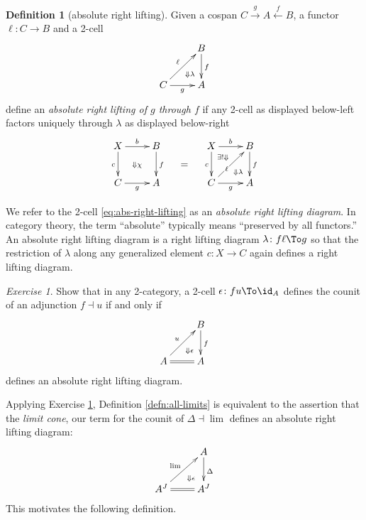 \documentclass[12pt,reqno]{amsart}
\theoremstyle{plain}
\theoremstyle{definition}
\newtheorem{defn}[thm]{Definition}
\theoremstyle{remark}
\newtheorem{exs}[thm]{Exercise}
\numberwithin{equation}{subsection}
\begin{document}
\begin{defn}[absolute right lifting] Given a cospan $C \xrightarrow{g} A \xleftarrow{f} B$, a functor $\ell \colon C \to B$ and a 2-cell \begin{equation}\label{eq:abs-right-lifting} \xymatrix{ \ar@{}[dr]|(.7){\Downarrow\lambda} & B \ar[d]^f \\ C \ar[ur]^\ell \ar[r]_g & A}\end{equation} define an \emph{absolute right lifting of $g$ through $f$} if any 2-cell as displayed below-left factors uniquely through $\lambda$ as displayed below-right
\[    \vcenter{\xymatrix{ X \ar[d]_c \ar[r]^b \ar@{}[dr]|{\Downarrow\chi} & B \ar[d]^f \\ C \ar[r]_g & A}} \mkern20mu = \mkern20mu \vcenter{\xymatrix{ X \ar[d]_c \ar[r]^b \ar@{}[dr]|(.3){\exists !\Downarrow}|(.7){\Downarrow\lambda} & B \ar[d]^f \\ C \ar[ur]|(.4)*+<2pt>{\scriptstyle \ell} \ar[r]_g & A}}
\]
\end{defn}

We refer to the 2-cell \eqref{eq:abs-right-lifting} as an \emph{absolute right lifting diagram}. In category theory, the term ``absolute'' typically means ``preserved by all functors.'' An absolute right lifting diagram is a right lifting diagram $\lambda \colon f\ell \To g$ so that the restriction of $\lambda$ along any generalized element $c \colon X \to C$ again defines a right lifting diagram.


\begin{exs}\label{exs:adj-as-abs-lifting} Show that in any 2-category, a 2-cell $\epsilon \colon fu \To \id_A$ defines the counit of an adjunction $f \dashv u$ if and only if
\[ \xymatrix{ \ar@{}[dr]|(.7){\Downarrow\epsilon} & B \ar[d]^f \\ A \ar[ur]^u \ar@{=}[r] & A}\] defines an absolute right lifting diagram.
\end{exs}


Applying Exercise \ref{exs:adj-as-abs-lifting}, Definition \ref{defn:all-limits} is equivalent to the assertion that the \emph{limit cone}, our term for the counit of $\Delta \dashv \lim$  defines an absolute right lifting diagram:
\begin{equation}\label{eq:all-limits-abs-lifting} \xymatrix{ \ar@{}[dr]|(.7){\Downarrow\epsilon} & A\ar[d]^\Delta \\ A^J \ar@{=}[r] \ar[ur]^{\lim} & A^J}\end{equation}  This motivates the following definition.
\end{document}
